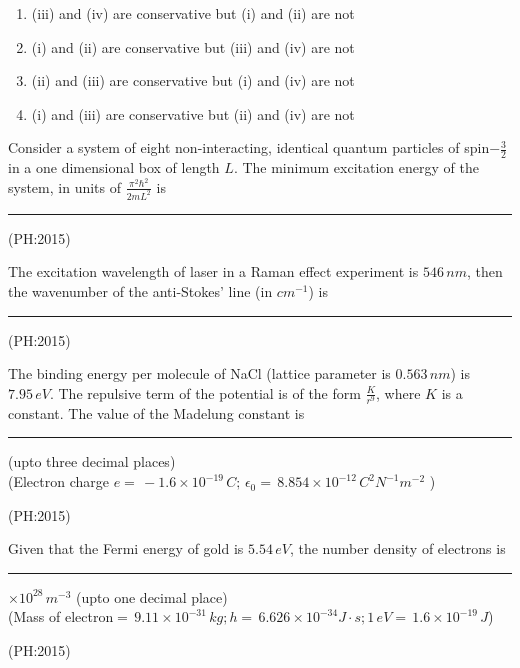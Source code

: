 \begin{enumerate}
    \item (iii) and (iv) are conservative but (i) and (ii) are not
    \item (i) and (ii) are conservative but (iii) and (iv) are not
    \item (ii) and (iii) are conservative but (i) and (iv) are not
    \item (i) and (iii) are conservative but (ii) and (iv) are not
\end{enumerate}
\item 
	Consider a system of eight non-interacting, identical quantum particles of spin$-\frac{3}{2}$ in a one dimensional box of length $L$. The minimum excitation energy of the system, in units of $\frac{\pi^2 \hbar^2}{2mL^2}$ is \rule{2cm}{0.4pt}

	\hfill{(PH:2015)}
	\vspace{0.5cm}
\item
	The excitation wavelength of laser in a Raman effect experiment is $546 \, nm$, then the wavenumber of the anti-Stokes' line (in $cm^{-1}$) is \rule{2cm}{0.4pt}

	\hfill{(PH:2015)}
	\vspace{0.5cm}
\item
	The binding energy per molecule of NaCl (lattice parameter is $0.563\, nm$) is $7.95\, eV$. The repulsive term of the potential is of the form $\frac{K}{r^9}$, where $K$ is a constant. The value of the Madelung constant is \rule{2cm}{0.4pt} (upto three decimal places)\\
	(Electron charge $e=\, -1.6\times 10^{-19}\, C;\, \epsilon_0 =\, 8.854\times 10^{-12} \, C^2 N^{-1} m^{-2}$  )

	\hfill{(PH:2015)}
	\vspace{0.5cm}
\item
	Given that the Fermi energy of gold is $5.54\, eV$, the number density of electrons is\\
	\rule{2cm}{0.4pt} $\times 10^{28}\, m^{-3}$ (upto one decimal place)\\
	\vspace{0.5cm}
(Mass of electron$=\, 9.11\times 10^{-31} \, kg;h=\, 6.626\times 10^{-34}J\cdot s; 1\, eV= \, 1.6\times 10^{-19}\, J$)

	\hfill{(PH:2015)}




